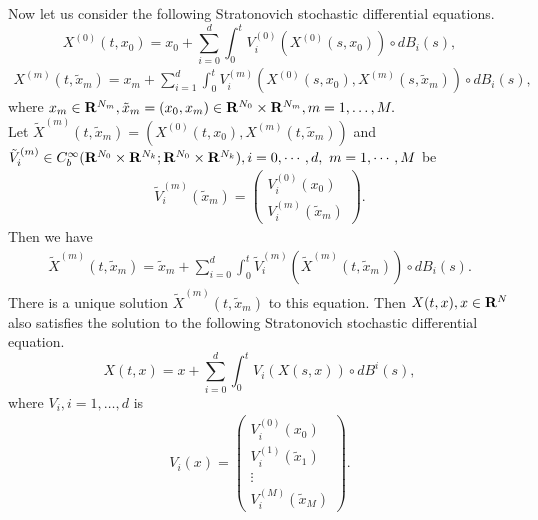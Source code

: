 \documentclass[12pt]{article}
\begin{document}
\noindent Now let us consider the following Stratonovich stochastic differential equations.
\begin{equation}
{X}^{(0)}(t,x_0) = {x}_0 + \sum_{i=0}^{d} \int_{0}^{t} V^{(0)}_{ i}({X}^{(0)}(s,{x}_0))\circ dB_i(s),
\label{eq:SDE0}
\end{equation}
\begin{align}
{X}^{(m)}(t,\tilde{x}_m) = {x}_m +  \sum_{i=1}^{d} \int_{0}^{t} V^{(m)}_{i}({X}^{(0)}(s,{x}_0), {X}^{(m)}(s,\tilde{x}_m))\circ dB_i(s),
\label{eq:SDEk}
\end{align}
where $x_m \in {\bf R}^{N_m}, \tilde{x}_m=(x_0, x_m) \in {\bf R}^{{N}_0}\times {\bf R}^{{N}_m}, m=1,\ldots,M.$\\
 Let $\tilde{X}^{(m)}(t,\tilde{x}_m) = ({X}^{(0)}(t,{x}_0), {X}^{(m)}(t,\tilde{x}_m))$ and $\tilde{V}^{(m)}_ i \in C^{\infty}_b({\bf R}^{{N}_0}\times {\bf R}^{{N}_k};{\bf R}^{{N}_0}\times{\bf R}^{{N}_k}), i =0, \cdots, d, \ m = 1,\cdots, M$ be \begin{align*}
 \tilde{V}^{(m)}_{i}(\tilde{x}_m)= 
 \begin{pmatrix}
 V^{(0)}_{ i}(x_0)\\
 V^{(m)}_{ i}(\tilde{x}_m)
 \end{pmatrix} .
 \end{align*}
Then we have
\begin{align}
\tilde{X}^{(m)}(t,\tilde{x}_m) = \tilde{x}_m + \sum_{i=0}^{d} \int_{0}^{t} \tilde{V}^{(m)}_i(\tilde{X}^{(m)}(t,\tilde{x}_m) )\circ d B_i(s).
\end{align}
There is a unique solution $\tilde{X}^{(m)}(t,\tilde{x}_m) $ 
to this equation. 
Then $X(t,x), x\in {\bf R}^N$ also satisfies the solution to the following Stratonovich stochastic differential equation. 
\begin{equation}
X(t,x) = x + \sum_{i=0}^{d} \int_{0}^{t} {V}_i(X(s,x))\circ d {B}^i(s),
\label{eq:SDE}
\end{equation}
where ${V}_i, i =1,\ldots, d$ is
\begin{align*}
 {V}_{i}(x)= 
 \begin{pmatrix}
 V^{(0)}_{ i}(x_0)\\
  V^{(1)}_{ i}(\tilde{x}_1)\\
 \vdots \\
 V^{(M)}_{ i}(\tilde{x}_M)
 \end{pmatrix} .
 \end{align*}
\end{document}

